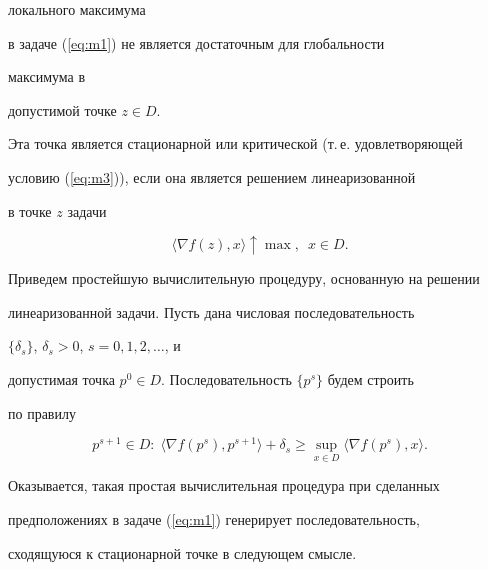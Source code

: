 локального максимума


в задаче (\ref{eq:m1}) не является достаточным для глобальности


максимума в


допустимой точке $z\in D$.


Эта точка является стационарной или критической (т.\,е. удовлетворяющей


условию (\ref{eq:m3})), если она является решением линеаризованной 


в точке $z$ задачи


$$


\langle \nabla f(z), x \rangle \uparrow \max, \ \; x \in D.


$$ 





Приведем простейшую вычислительную процедуру, основанную на решении


линеаризованной задачи. Пусть дана числовая последовательность 


$\{\delta_{s}\}$, $\delta_{s}>0$, $s=0,1,2,\dotsc$, и 


допустимая точка $p^{0}\in D$. Последовательность $\{p^{s}\}$ будем строить


по правилу


\begin{equation}


p^{s+1}\in D : \; \langle \nabla f(p^{s}), p^{s+1} \rangle + \delta_{s} \geq 


\sup_{x \in D} \langle \nabla f(p^{s}), x \rangle . 


\label{eq:m4}


\end{equation} 


Оказывается, такая простая вычислительная процедура при сделанных


предположениях в задаче (\ref{eq:m1}) генерирует последовательность,


сходящуюся к стационарной точке в следующем смысле.





